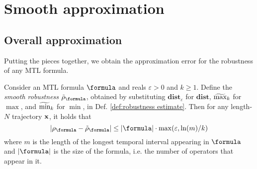\section{Smooth approximation}
\label{sec:smooth apx}
\newcommand{\fe}{f_\varepsilon}




\subsection{Overall approximation}
Putting the pieces together, we obtain the approximation error for the robustness of any MTL formula.
\begin{theorem}
	\label{thm:total apx error}
	Consider an MTL formula $\formula$ and reals $\varepsilon > 0$ and $k \geq 1$. 
	Define the \textit{smooth robustness} $\srobf$, obtained by substituting $\mathbf{dist}_\varepsilon$ for $\mathbf{dist}$, $\widetilde{\max}_k$ for $\max$, and $\widetilde{\min}_k$ for $\min$, in Def. \ref{def:robustness estimate}.
	Then for any length-$N$ trajectory $\mathbf{x}$, it holds that
	\[|\robf-\srobf| \leq |\formula| \cdot \max(\varepsilon,\ln(m)/k)\]
	where $m$ is the length of the longest temporal interval appearing in $\formula$ and $|\formula|$ is the size of the formula, i.e. the number of operators that appear in it.
\end{theorem}
